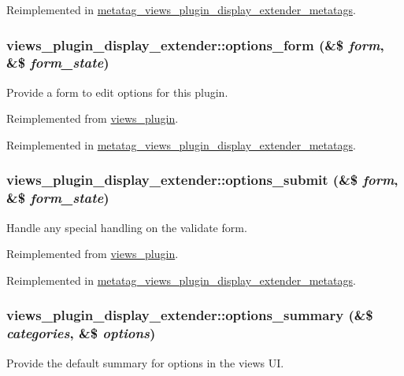 Reimplemented in \hyperlink{classmetatag__views__plugin__display__extender__metatags_abde4b6c185453983c25a43ceed776603}{metatag\_\-views\_\-plugin\_\-display\_\-extender\_\-metatags}.\hypertarget{classviews__plugin__display__extender_abbc782f6c6cdaa21db41379a7fbbb61c}{
\subsubsection[{options\_\-form}]{\setlength{\rightskip}{0pt plus 5cm}views\_\-plugin\_\-display\_\-extender::options\_\-form (\&\$ {\em form}, \/  \&\$ {\em form\_\-state})}}
\label{classviews__plugin__display__extender_abbc782f6c6cdaa21db41379a7fbbb61c}
Provide a form to edit options for this plugin. 

Reimplemented from \hyperlink{classviews__plugin_a1aaed8da1afd9f45293a37358c159837}{views\_\-plugin}.

Reimplemented in \hyperlink{classmetatag__views__plugin__display__extender__metatags_a546520f911ecde644d594b6231aabb3a}{metatag\_\-views\_\-plugin\_\-display\_\-extender\_\-metatags}.\hypertarget{classviews__plugin__display__extender_a30f3b8a5bd28012f09b9e5dbb4a2a083}{
\subsubsection[{options\_\-submit}]{\setlength{\rightskip}{0pt plus 5cm}views\_\-plugin\_\-display\_\-extender::options\_\-submit (\&\$ {\em form}, \/  \&\$ {\em form\_\-state})}}
\label{classviews__plugin__display__extender_a30f3b8a5bd28012f09b9e5dbb4a2a083}
Handle any special handling on the validate form. 

Reimplemented from \hyperlink{classviews__plugin_a442b0f392deb52725ec8159e05654e06}{views\_\-plugin}.

Reimplemented in \hyperlink{classmetatag__views__plugin__display__extender__metatags_a7485da0c4d0a0b1bab8e2df1fceca06b}{metatag\_\-views\_\-plugin\_\-display\_\-extender\_\-metatags}.\hypertarget{classviews__plugin__display__extender_a7f95727e4d29fc9450bfcb38df8d7fa9}{
\subsubsection[{options\_\-summary}]{\setlength{\rightskip}{0pt plus 5cm}views\_\-plugin\_\-display\_\-extender::options\_\-summary (\&\$ {\em categories}, \/  \&\$ {\em options})}}
\label{classviews__plugin__display__extender_a7f95727e4d29fc9450bfcb38df8d7fa9}
Provide the default summary for options in the views UI.

